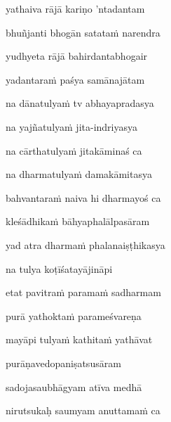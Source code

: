 \ujvers\nemsloka 
yathaiva rājā kariṇo 'ntadantam
\dontdisplaylinenum

\nemslokab 
bhuñjanti bhogān satataṁ narendra \danda\dontdisplaylinenum

\nemslokac 
yudhyeta rājā bahirdantabhogair
\dontdisplaylinenum

\nemslokad 
yadantaraṁ paśya samānajātam \veg\dontdisplaylinenum
{}

\ujvers\nemsloka 
na dānatulyaṁ tv abhayapradasya
\dontdisplaylinenum

\nemslokab 
na yajñatulyaṁ jita-indriyasya \danda\dontdisplaylinenum

\nemslokac 
na cārthatulyaṁ jitakāminaś ca
\dontdisplaylinenum

\nemslokad 
na dharmatulyaṁ damakāmitasya \veg\dontdisplaylinenum
{}

\ujvers\nemsloka 
bahvantaraṁ naiva hi dharmayoś ca
\dontdisplaylinenum

\nemslokab 
kleśādhikaṁ bāhyaphalālpasāram \danda\dontdisplaylinenum

\nemslokac 
yad atra dharmaṁ phalanaiṣṭhikasya
\dontdisplaylinenum

\nemslokad 
na tulya koṭīśatayājināpi \veg\dontdisplaylinenum
{}

\ujvers\nemsloka 
etat pavitraṁ paramaṁ sadharmam
\dontdisplaylinenum

\nemslokab 
purā yathoktaṁ parameśvareṇa \danda\dontdisplaylinenum

\nemslokac 
mayāpi tulyaṁ kathitaṁ yathāvat
\dontdisplaylinenum

\nemslokad 
purāṇavedopaniṣatsusāram \veg\dontdisplaylinenum

\ujvers\nemsloka 
sadojasaubhāgyam atīva medhā
\dontdisplaylinenum

\nemslokab 
nirutsukaḥ saumyam anuttamaṁ ca \danda\dontdisplaylinenum

